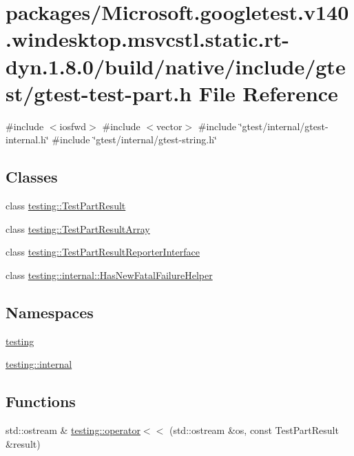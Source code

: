 \hypertarget{gtest-test-part_8h}{}\section{packages/\+Microsoft.googletest.\+v140.\+windesktop.\+msvcstl.\+static.\+rt-\/dyn.1.8.0/build/native/include/gtest/gtest-\/test-\/part.h File Reference}
\label{gtest-test-part_8h}
{\ttfamily \#include $<$iosfwd$>$}\newline
{\ttfamily \#include $<$vector$>$}\newline
{\ttfamily \#include \char`\"{}gtest/internal/gtest-\/internal.\+h\char`\"{}}\newline
{\ttfamily \#include \char`\"{}gtest/internal/gtest-\/string.\+h\char`\"{}}\newline
\subsection*{Classes}
\begin{DoxyCompactItemize}
\item 
class \mbox{\hyperlink{classtesting_1_1_test_part_result}{testing\+::\+Test\+Part\+Result}}
\item 
class \mbox{\hyperlink{classtesting_1_1_test_part_result_array}{testing\+::\+Test\+Part\+Result\+Array}}
\item 
class \mbox{\hyperlink{classtesting_1_1_test_part_result_reporter_interface}{testing\+::\+Test\+Part\+Result\+Reporter\+Interface}}
\item 
class \mbox{\hyperlink{classtesting_1_1internal_1_1_has_new_fatal_failure_helper}{testing\+::internal\+::\+Has\+New\+Fatal\+Failure\+Helper}}
\end{DoxyCompactItemize}
\subsection*{Namespaces}
\begin{DoxyCompactItemize}
\item 
 \mbox{\hyperlink{namespacetesting}{testing}}
\item 
 \mbox{\hyperlink{namespacetesting_1_1internal}{testing\+::internal}}
\end{DoxyCompactItemize}
\subsection*{Functions}
\begin{DoxyCompactItemize}
\item 
std\+::ostream \& \mbox{\hyperlink{namespacetesting_a266e39b7c4691fedb856047673a412d8}{testing\+::operator$<$$<$}} (std\+::ostream \&os, const Test\+Part\+Result \&result)
\end{DoxyCompactItemize}
